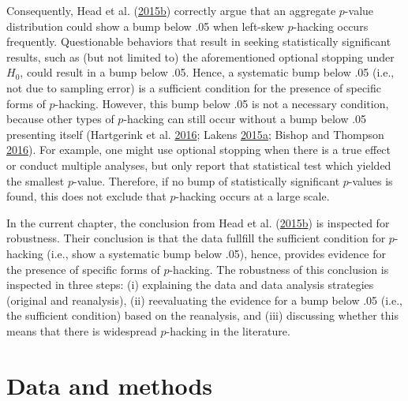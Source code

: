 \documentclass[a5paper]{book}
\begin{document}
Consequently, Head et al.
(\protect\hyperlink{ref-doi:10.1371ux2fjournal.pbio.1002106}{2015}\protect\hyperlink{ref-doi:10.1371ux2fjournal.pbio.1002106}{b})
correctly argue that an aggregate \(p\)-value distribution could show a
bump below .05 when left-skew \(p\)-hacking occurs frequently.
Questionable behaviors that result in seeking statistically significant
results, such as (but not limited to) the aforementioned optional
stopping under \(H_0\), could result in a bump below .05. Hence, a
systematic bump below .05 (i.e., not due to sampling error) is a
sufficient condition for the presence of specific forms of
\(p\)-hacking. However, this bump below .05 is not a necessary
condition, because other types of \(p\)-hacking can still occur without
a bump below .05 presenting itself (Hartgerink et al.
\protect\hyperlink{ref-doi:10.7717ux2fpeerj.1935}{2016}; Lakens
\protect\hyperlink{ref-doi:10.1080ux2f17470218.2014.982664}{2015}\protect\hyperlink{ref-doi:10.1080ux2f17470218.2014.982664}{a};
Bishop and Thompson
\protect\hyperlink{ref-doi:10.7717ux2fpeerj.1715}{2016}). For example,
one might use optional stopping when there is a true effect or conduct
multiple analyses, but only report that statistical test which yielded
the smallest \(p\)-value. Therefore, if no bump of statistically
significant \(p\)-values is found, this does not exclude that
\(p\)-hacking occurs at a large scale.

In the current chapter, the conclusion from Head et al.
(\protect\hyperlink{ref-doi:10.1371ux2fjournal.pbio.1002106}{2015}\protect\hyperlink{ref-doi:10.1371ux2fjournal.pbio.1002106}{b})
is inspected for robustness. Their conclusion is that the data fullfill
the sufficient condition for \(p\)-hacking (i.e., show a systematic bump
below .05), hence, provides evidence for the presence of specific forms
of \(p\)-hacking. The robustness of this conclusion is inspected in
three steps: (i) explaining the data and data analysis strategies
(original and reanalysis), (ii) reevaluating the evidence for a bump
below .05 (i.e., the sufficient condition) based on the reanalysis, and
(iii) discussing whether this means that there is widespread
\(p\)-hacking in the literature.

\section{Data and methods}\label{data-and-methods}
\end{document}
